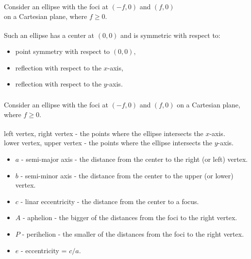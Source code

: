 \documentclass[aspectratio=169,xcolor=pdftex,dvipsnames]{beamer} %
\begin{document}

\begin{frame}
\frametitle{}

Consider an ellipse with the foci at $(-f,0)$ and $(f,0)$\\
on a Cartesian plane, where $f\ge 0$.\\
\ \\
Such an ellipse has a center at $(0,0)$ and is symmetric with respect to:
\begin{itemize}
\item
    point symmetry with respect to $(0,0)$,
\item
    reflection with respect to the $x$-axis,
\item
    reflection with respect to the $y$-axis.
\end{itemize}

\end{frame}


\begin{frame}
\frametitle{}

Consider an ellipse with the foci at $(-f,0)$ and $(f,0)$
on a Cartesian plane, where $f\ge 0$.\\
\ \\
left vertex, right vertex - the points where the ellipse intersects the $x$-axis.\\
lower vertex, upper vertex - the points where the ellipse intersects the $y$-axis.\\

\begin{itemize}
\item
$a$ - semi-major axis - the distance from the center to the right (or left) vertex.
\item
$b$ - semi-minor axis - the distance from the center to the upper (or lower) vertex.
\item
$c$ - linar eccentricity - the distance from the center to a focus.
\item
$A$ - aphelion - the bigger of the distances from the foci to the right vertex.
\item
$P$ - perihelion - the smaller of the distances from the foci to the right vertex.
\item
$e$ - eccentricity = $c/a$.
\end{itemize}

\end{frame}
\end{document}
